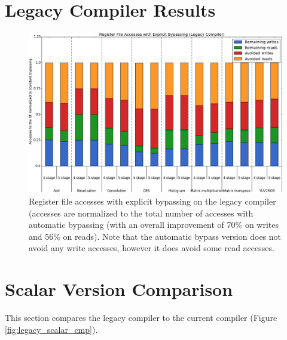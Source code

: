 \section{Legacy Compiler Results}

\begin{figure}[b!]
\centering
\hspace*{-.12in}
\includegraphics[width=\textwidth]{figures/stats/legacy_accesses}
\caption{Register file accesses with explicit bypassing on the legacy compiler (accesses are normalized to the total number of accesses with automatic bypassing (with an overall improvement of 70\% on writes and 56\% on reads). Note that the automatic bypass version does not avoid any write accesses, however it does avoid some read accesses.}
\label{fig:legacy_access_improvements}
\end{figure}




\section{Scalar Version Comparison}
This section compares the legacy compiler to the current compiler (Figure \ref{fig:legacy_scalar_cmp}).  

